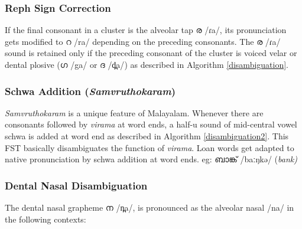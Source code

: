 \documentclass{ieeeaccess}
\begin{document}
\subsubsection{Reph Sign Correction}

If the final consonant in a cluster is the alveolar tap {\mal ര} {\ipa /ɾa/}, its pronunciation gets modified to {\mal റ} {\ipa /ra/} depending on the preceding consonants. The  {\mal ര}  {\ipa /ɾa/} sound is retained only if the preceding consonant of the cluster is voiced velar or dental plosive ({\mal ഗ} {\ipa /ga/} or {\mal ദ} {\ipa /d̪a/}) as described in Algorithm \ref{disambiguation}.


\subsubsection{Schwa Addition (\textit{Samvruthokaram})}

\textit{Samvruthokaram} is a unique feature of Malayalam. Whenever there are consonants followed by \textit{virama} at word ends, a half-u sound of mid-central vowel schwa is added at word end as described in Algorithm \ref{disambiguation2}. This FST basically disambiguates the function of \textit{virama}. Loan words get adapted to native pronunciation by schwa addition at word ends. eg: {\mal ബാങ്ക്} {\ipa /baːŋkə/} (\textit{bank)}




\subsubsection{Dental Nasal Disambiguation}

The dental nasal grapheme {\mal ന} {\ipa /n̪a/}, is pronounced as the alveolar nasal {\ipa /na/} in the following  contexts\cite{prabo2016}:
\end{document}

